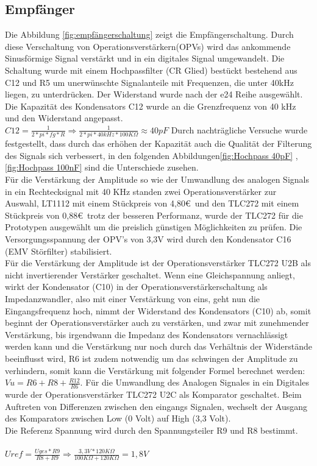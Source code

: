 \subsection{Empfänger}
Die Abbildung \ref{fig:empfängerschaltung} zeigt die Empfängerschaltung. Durch diese Verschaltung von Operationsverstärkern(OPVs) wird das ankommende Sinusförmige Signal verstärkt und in ein digitales Signal umgewandelt. Die Schaltung wurde mit einem Hochpassfilter (CR Glied) bestückt bestehend aus C12 und R5 um unerwünschte Signalanteile mit Frequenzen, die unter 40kHz liegen, zu unterdrücken. Der Widerstand wurde nach der e24 Reihe ausgewählt.
Die Kapazität des Kondensators C12 wurde an die Grenzfrequenz von 40 kHz und den Widerstand angepasst.
\onehalfspacing \\
\(\displaystyle C12=\frac{1}{2*pi*fg*R}\Rightarrow\frac{1}{2*pi*40kHz*100 K\Omega}\approx40pF \)
\singlespacing
Durch nachträgliche Versuche wurde festgestellt, dass durch das erhöhen der Kapazität auch die Qualität der Filterung des Signals sich verbessert, in den folgenden Abbildungen\ref{fig:Hochpass 40pF} ,\ref{fig:Hochpass 100nF} sind die Unterschiede zusehen. \\
Für die Verstärkung der Amplitude so wie der Umwandlung des analogen Signals in ein Rechtecksignal mit 40 KHz standen zwei Operationsverstärker zur Auswahl, LT1112 mit einem Stückpreis von 4,80\euro\  und den TLC272 mit einem Stückpreis von 0,88\euro\  trotz der besseren Performanz, wurde der TLC272 für die Prototypen ausgewählt um die preislich günstigen Möglichkeiten zu prüfen. Die Versorgungsspannung der OPV's von 3,3V wird durch den Kondensator C16 (EMV Störfilter) stabilisiert.\\
Für die Verstärkung der Amplitude ist der Operationsverstärker TLC272 U2B als  nicht invertierender Verstärker geschaltet.
Wenn eine Gleichspannung anliegt, wirkt der Kondensator (C10) in der Operationsverstärkerschaltung als Impedanzwandler, also mit einer Verstärkung von eins, geht nun die Eingangsfrequenz hoch, nimmt der Widerstand des Kondensators (C10) ab, somit beginnt der Operationsverstärker auch zu verstärken, und zwar mit zunehmender Verstärkung, bis irgendwann die Impedanz des Kondensators vernachlässigt werden kann und die Verstärkung nur noch durch das Verhältnis der Widerstände beeinflusst wird, R6 ist zudem notwendig um das schwingen der Amplitude zu verhindern, somit kann die Verstärkung mit folgender Formel berechnet werden:
\onehalfspacing \\
\(\displaystyle Vu=R6+R8+\frac{R12}{R6} .\) 
\singlespacing
Für die Umwandlung des Analogen Signales in ein Digitales wurde der Operationsverstärker TLC272 U2C als Komparator geschaltet. Beim Auftreten von Differenzen zwischen den eingangs Signalen, wechselt der Ausgang des Komparators zwischen Low (0 Volt) auf High (3,3 Volt).\\ Die Referenz Spannung wird durch den Spannungsteiler R9 und R8 bestimmt.\\\\
\(\displaystyle Uref=\frac{Uges*R9}{R8+R9}\Rightarrow\frac{3,3V*120K\Omega}{100K\Omega+120K\Omega}=1,8V \)

